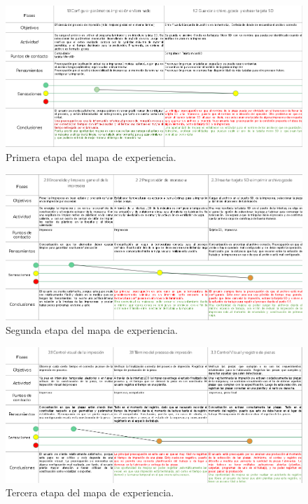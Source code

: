 \begin{enumerate}
\begin{figure}[H]
\includegraphics[scale=0.55]{images/jm1.png}
\caption{Primera etapa del mapa de experiencia.}
\end{figure}
\begin{figure}[H]
\includegraphics[scale=0.55]{images/jm2.png}
\caption{Segunda etapa del mapa de experiencia.}
\end{figure}
\begin{figure}[H]
\includegraphics[scale=0.55]{images/jm3.png}
\caption{Tercera etapa del mapa de experiencia.}
\end{figure}

\end{enumerate}

